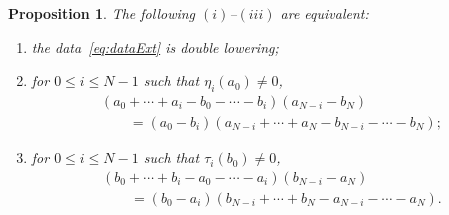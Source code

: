 \documentclass[pdftex]{sigma}
\numberwithin{equation}{section}
\newtheorem{Proposition}[Theorem]{Proposition}
\begin{document}
\begin{Proposition}\label{prop:feas3}
The following
$(i)$--$(iii)$ are equivalent:
\begin{enumerate}\itemsep=0pt
\item[$(i)$] the data~\eqref{eq:dataExt}
is double lowering;
\item[$(ii)$] for $0 \leq i \leq N-1$ such that $\eta_i(a_0)\not=0$,
\begin{gather*}
(a_0+ \cdots + a_i -b_0-\cdots - b_i)(a_{N-i}-b_N)\\
\qquad{} = (a_0-b_i)(a_{N-i}+ \cdots + a_N-b_{N-i}- \cdots -b_N);
\end{gather*}
\item[$(iii)$] for $0 \leq i \leq N-1$ such that $\tau_i(b_0)\not=0$,
\begin{gather*}
(b_0+ \cdots + b_i -a_0-\cdots - a_i)(b_{N-i}-a_N)\\
\qquad{} = (b_0-a_i)(b_{N-i}+ \cdots + b_N-a_{N-i}- \cdots -a_N).
\end{gather*}
\end{enumerate}
\end{Proposition}
\end{document}
